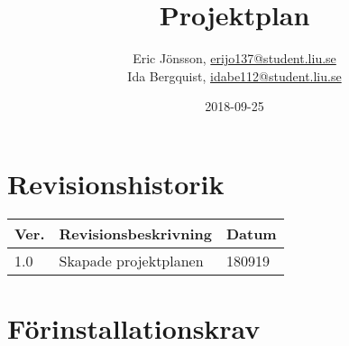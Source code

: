 \documentclass{TDP003mall}
\author{Eric Jönsson, \url{erijo137@student.liu.se}\\
  Ida Bergquist, \url{idabe112@student.liu.se}}
\title{Projektplan}
\date{2018-09-25}
\begin{document}
\projectpage
\section{Revisionshistorik}
\begin{table}[!h]
\begin{tabularx}{\linewidth}{|l|X|l|}
\hline
Ver. & Revisionsbeskrivning & Datum \\\hline
1.0 & Skapade projektplanen & 180919 \\\hline
\end{tabularx}
\end{table}

\section{Förinstallationskrav}
\end{document}
